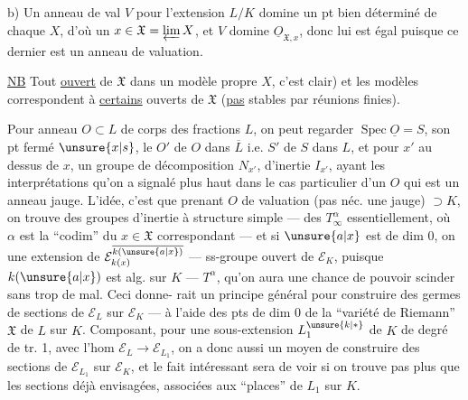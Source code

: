 b) Un anneau de val $V$  pour l'extension $L/K$ domine un pt bien déterminé de chaque $X$, d'où un $x\in\mathfrak X=\varprojlim X$, et $V$ domine $\underline{O}_{\mathfrak X,x}$, donc lui est égal puisque ce dernier est un anneau de valuation.

\uline{NB} Tout  \uline{ouvert} de $\mathfrak X$    dans un modèle propre $X$, c'est clair) et  les modèles correspondent à \uline{certains} ouverts de $\mathfrak X$ (\uline{pas} stables par réunions finies).

Pour  anneau   $O\subset L$ de corps des fractions $L$, on peut regarder $\operatorname{Spec}\underline{O}=S$, son pt fermé $\unsure{x|s}$, le 
$O'$ de $O$ dans $\overline L$ i.e. $S'$ de $S$ dans $L$, et pour $x'$ au dessus de $x$, un groupe de décomposition $N_{x'}$, d'inertie $I_{x'}$, ayant les interprétations qu'on a signalé plus haut dans le cas particulier d'un $O$ qui est un anneau jauge. L'idée, c'est que prenant $O$ de valuation (pas néc. une jauge) $\supset K$, on trouve des groupes d'inertie à structure simple --- des $T_\infty^\alpha$ essentiellement, où $\alpha$ est la ``codim'' du $x\in\mathfrak X$ correspondant --- et si $\unsure{a|x}$ est de dim 0, on  une extension de $\mathcal E_{k(x)}^{\overline{k(\unsure{a|x})}}$ --- ss-groupe ouvert de $\mathcal E_K$, puisque $k(\unsure{a|x})$ est  alg. sur $K$ ---  $T^\alpha$, qu'on aura une chance de pouvoir scinder sans trop de mal. Ceci donne-
rait un principe général pour construire des germes de sections de $\mathcal E_L$ sur $\mathcal E_K$ --- à l'aide des pts de dim 0 de la ``variété de Riemann'' $\mathfrak X$ de $L$ sur $K$. Composant, pour une sous-extension $L_1^{\unsure{k|*}}$ de $K$ de degré de tr. 1, avec l'hom $\mathcal E_L\longrightarrow\mathcal E_{L_1}$, on a donc aussi un moyen de construire des  sections de $\mathcal E_{L_1}$ sur $\mathcal E_K$, et le fait intéressant sera de voir si on  trouve pas plus que les sections déjà envisagées, associées aux ``places'' de $L_1$ sur $K$.

